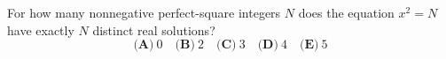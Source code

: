 For how many nonnegative perfect-square integers $N$ does the equation $x^2=N$ have exactly $N$ distinct real solutions?
\[\textbf{(A)}~0\quad\textbf{(B)}~2\quad\textbf{(C)}~3\quad\textbf{(D)}~4\quad\textbf{(E)}~5\]
